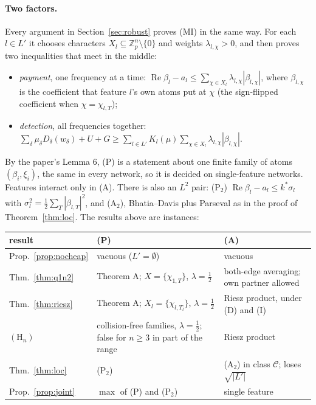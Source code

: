 \documentclass[11pt]{article}
\theoremstyle{definition}
\renewcommand{\Re}{\operatorname{Re}}
\begin{document}
\paragraph{Two factors.}  Every argument in Section~\ref{sec:robust} proves (MI) in the same way.  For each $l\in L'$ it chooses characters
$X_l\subseteq\mathbb Z_p^n\setminus\{0\}$ and weights $\lambda_{l,\chi}>0$, and then proves two inequalities that meet in the middle:
\begin{itemize}
\item[(P)] \emph{payment}, one frequency at a time: $\Re\beta_l-a_l\le\sum_{\chi\in X_l}\lambda_{l,\chi}|\beta_{l,\chi}|$, where $\beta_{l,\chi}$ is the
coefficient that feature $l$'s own atoms put at $\chi$ (the sign-flipped coefficient when $\chi=\chi_{l,T}$);
\item[(A)] \emph{detection}, all frequencies together: $\sum_\delta\mu_\delta D_\delta(w_\delta)+U+G\ge\sum_{l\in L'}K_l(\mu)\sum_{\chi\in X_l}\lambda_{l,\chi}|\beta_{l,\chi}|$.
\end{itemize}
By the paper's Lemma 6, (P) is a statement about one finite family of atoms $(\beta_i,\xi_i)$, the same in every network, so it is
decided on single-feature networks.  Features interact only in (A).  There is also an $L^2$ pair:
(P$_2$) $\Re\beta_l-a_l\le k^*\sigma_l$ with $\sigma_l^2=\frac12\sum_T|\beta_{l,T}|^2$, and (A$_2$), Bhatia--Davis plus Parseval as in the proof of
Theorem~\ref{thm:loc}.  The results above are instances:
\begin{center}
\begin{tabular}{p{}p{}p{}}
\toprule
result & (P) & (A)\\
\midrule
Prop.~\ref{prop:nocheap} & vacuous ($L'=\emptyset$) & vacuous\\
Thm.~\ref{thm:q1n2} & Theorem A; $X=\{\chi_{1,T}\}$, $\lambda=\frac12$ & both-edge averaging; own partner allowed\\
Thm.~\ref{thm:riesz} & Theorem A; $X_l=\{\chi_{l,T_l}\}$, $\lambda=\frac12$ & Riesz product, under (D) and (I)\\
$(\mathrm H_n)$ & collision-free families, $\lambda=\frac12$; false for $n\ge3$ in part of the range & Riesz product\\
Thm.~\ref{thm:loc} & (P$_2$) & (A$_2$) in class $\mathcal C$; loses $\sqrt{|L'|}$\\
Prop.~\ref{prop:joint} & $\max$ of (P) and (P$_2$) & single feature\\
\bottomrule
\end{tabular}
\end{center}
\end{document}
